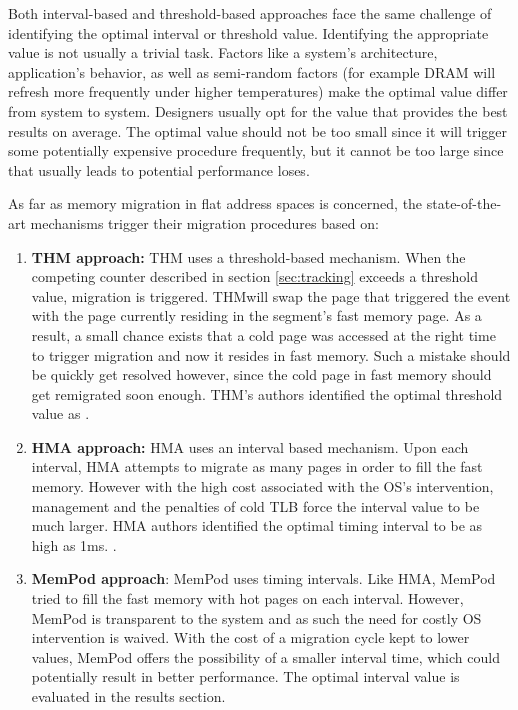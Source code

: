 Both interval-based and threshold-based approaches face the same challenge of identifying the optimal interval or threshold value. Identifying the appropriate value is not usually a trivial task. Factors like a system's architecture, application's behavior, as well as semi-random factors (for example DRAM will refresh more frequently under higher temperatures) make the optimal value differ from system to system. Designers usually opt for the value that provides the best results on average. The optimal value should not be too small since it will trigger some potentially expensive procedure frequently, but it cannot be too large since that usually leads to potential performance loses. 

As far as memory migration in flat address spaces is concerned, the state-of-the-art mechanisms trigger their migration procedures based on:
\begin{enumerate}
	\item \textbf{THM approach:} THM uses a threshold-based mechanism. When the competing counter described in section \ref{sec:tracking} exceeds a threshold value, migration is triggered. THMwill swap the page that triggered the event with the page currently residing in the segment's fast memory page. As a result, a small chance exists that a cold page was accessed at the right time to trigger migration and now it resides in fast memory. Such a mistake should be quickly get resolved however, since the cold page in fast memory should get remigrated soon enough.  THM's authors identified the optimal threshold value as .
	\item \textbf{HMA approach:} HMA uses an interval based mechanism. Upon each interval, HMA attempts to migrate as many pages in order to fill the fast memory. However with the high cost associated with the OS's intervention, management and the penalties of cold TLB force the interval value to be much larger. HMA authors identified the optimal timing interval to be as high as 1ms. .
	\item \textbf{MemPod approach}: MemPod uses timing intervals. Like HMA, MemPod tried to fill the fast memory with hot pages on each interval. However, MemPod is transparent to the system and as such the need for costly OS intervention is waived. With the cost of a migration cycle kept to lower values, MemPod offers the possibility of a smaller interval time, which could potentially result in better performance. The optimal interval value is evaluated in the results section.
\end{enumerate}

